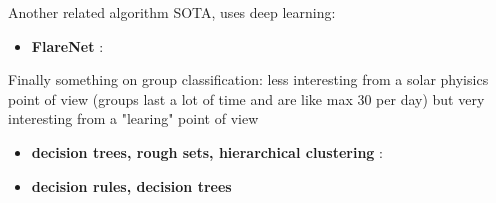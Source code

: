 Another related algorithm SOTA, uses deep learning:
\begin{itemize}
  \item \textbf{FlareNet} \cite{McGregor2017}:
\end{itemize}
Finally something on group classification: less interesting from a solar phyisics point of view (groups last a lot of time and are like max 30 per day) but very interesting from a "learing" point of view
\begin{itemize}
  \item \textbf{decision trees, rough sets, hierarchical clustering} \cite{nguyen2006learning}:
  \item \textbf{decision rules, decision trees} \cite{colak2007automatic}
\end{itemize}
